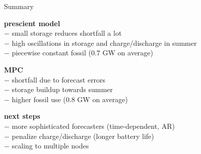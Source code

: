 \documentclass[aspectratio=169,11pt]{beamer}
\begin{document}
\begin{frame}{Summary} 
\BIT
\item \textbf{prescient model}  \\
\hspace{12mm} $-$ small storage reduces shortfall a lot\\
\hspace{12mm} $-$ high oscillations in storage and charge/discharge in summer\\
\hspace{12mm} $-$ piecewise constant fossil ($0.7$ GW on average)\\
\item \textbf{MPC}  \\
\hspace{12mm} $-$ shortfall due to forecast errors\\
\hspace{12mm} $-$ storage buildup towards summer\\
\hspace{12mm} $-$ higher fossil use ($0.8$ GW on average)\\
\item \textbf{next steps} \\
\hspace{12mm} $-$ more sophisticated forecasters (time-dependent, AR)\\
\hspace{12mm} $-$ penalize charge/discharge (longer battery life)\\
\hspace{12mm} $-$ scaling to multiple nodes\\
\EIT
\end{frame}
    
\end{document}
